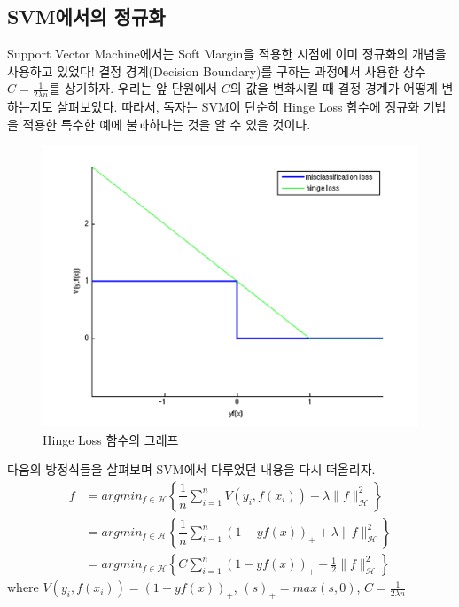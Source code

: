 \documentclass[a4paper]{oblivoir}
\begin{document}
\subsection{SVM에서의 정규화}
Support Vector Machine에서는 Soft Margin을 적용한 시점에 이미 정규화의 개념을 사용하고 있었다! 결정 경계(Decision Boundary)를 구하는 과정에서 사용한 상수 $C = \frac{1}{2\lambda n}$를 상기하자. 우리는 앞 단원에서 $C$의 값을 변화시킬 때 결정 경계가 어떻게 변하는지도 살펴보았다. 따라서, 독자는 SVM이 단순히 Hinge Loss 함수에 정규화 기법을 적용한 특수한 예에 불과하다는 것을 알 수 있을 것이다.
\begin{figure}[ht]
\centering
\includegraphics[scale=0.7]{SVM.png}
\caption{Hinge Loss 함수의 그래프}
\label{Figure 6-11}
\end{figure}

\indent 다음의 방정식들을 살펴보며 SVM에서 다루었던 내용을 다시 떠올리자.
\begin{align}
f &= argmin_{f \in \mathcal{H}} \left\{ \dfrac{1}{n}\sum_{i=1}^{n}V(y_{i}, f(x_{i})) + \lambda \| f \|_{\mathcal{H}}^{2} \right\} \tag{6-25}\\
&= argmin_{f \in \mathcal{H}} \left\{ \dfrac{1}{n}\sum_{i=1}^{n}(1-yf(x))_{+} + \lambda \| f \|_{\mathcal{H}}^{2} \right\} \tag{6-26}\\
&= argmin_{f \in \mathcal{H}} \left\{ C\sum_{i=1}^{n}(1-yf(x))_{+} + \frac{1}{2} \| f \|_{\mathcal{H}}^{2} \right\} \tag{6-27}
\end{align}
where $V(y_{i}, f(x_{i})) = (1-yf(x))_{+}$,   $(s)_{+} = max(s,0)$,   $C=\frac{1}{2 \lambda n}$\\
\end{document}
